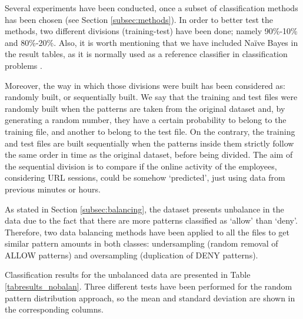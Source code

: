 \documentclass{llncs}
\begin{document}
\noindent Several experiments have been conducted, once a subset of classification methods has been chosen (see Section \ref{subsec:methods}). In order to better test the methods, two different divisions (training-test) have been done; namely 90\%-10\% and 80\%-20\%. Also, it is worth mentioning that we have included Naïve Bayes in the result tables, as it is normally used as a reference classifier in classification problems \cite{Frank2011}.   

Moreover, the way in which those divisions were built has been considered as: randomly built, or sequentially built. We say that the training and test files were randomly built when the patterns are taken from the original dataset and, by generating a random number, they have a certain probability to belong to the training file, and another to belong to the test file. On the contrary, the training and test files are built sequentially when the patterns inside them strictly follow the same order in time as the original dataset, before being divided. The aim of the sequential division is to compare if the online activity of the employees, considering URL sessions, could be somehow `predicted', just using data from previous minutes or hours.

As stated in Section \ref{subsec:balancing}, the dataset presents unbalance in the data due to the fact that there are more patterns classified as `allow' than `deny'. Therefore, two data balancing methods have been applied to all the files to get similar pattern amounts in both classes: undersampling (random removal of ALLOW patterns) and oversampling (duplication of DENY patterns). 

Classification results for the unbalanced data are presented in Table \ref{tabresults_nobalan}. Three different tests have been performed for the random pattern distribution approach, so the mean and standard deviation are shown in the corresponding columns.
\end{document}
